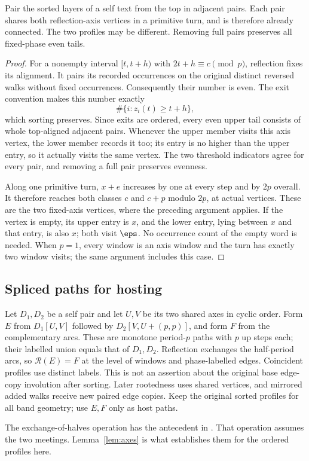 \begin{lemma}\label{lem:axes}
Pair the sorted layers of a self text from the top in adjacent pairs.
Each pair shares both reflection-axis vertices in a primitive turn,
and is therefore already connected. The two profiles may be different.
Removing full pairs preserves all fixed-phase even tails.
\end{lemma}
\begin{proof}
For a nonempty interval $[t,t+h)$ with $2t+h\equiv c\pmod p$,
reflection fixes its alignment. It pairs its recorded occurrences on
the original distinct reversed walks without fixed occurrences.
Consequently their number is even. The exit convention makes this
number exactly
\begin{equation}\label{eq:even-tail}
\#\{i:z_i(t)\ge t+h\},
\end{equation}
which sorting preserves. Since exits are ordered, every even upper
tail consists of whole top-aligned adjacent pairs. Whenever the upper
member visits this axis vertex, the lower member records it too; its
entry is no higher than the upper entry, so it actually visits the same
vertex. The two threshold indicators agree for every pair, and removing
a full pair preserves evenness.

Along one primitive turn, $x+e$ increases by one at every step and by
$2p$ overall. It therefore reaches both classes $c$ and $c+p$ modulo
$2p$, at actual vertices. These are the two fixed-axis vertices, where
the preceding argument applies. If the vertex is empty, its upper
entry is $x$, and the lower entry, lying between $x$ and that entry,
is also $x$; both visit $\eps$. No occurrence count of the empty word
is needed. When $p=1$, every window is an axis window and the turn has
exactly two window visits; the same argument includes this case.
\end{proof}

\subsection{Spliced paths for hosting}\label{sec:splice}
Let $D_1,D_2$ be a self pair and let $U,V$ be its two shared axes in
cyclic order. Form $E$ from $D_1[U,V]$ followed by
$D_2[V,U+(p,p)]$, and form $F$ from the complementary arcs.
These are monotone period-$p$ paths with $p$ up steps each; their
labelled union equals that of $D_1,D_2$. Reflection exchanges the
half-period arcs, so $\mathcal R(E)=F$ at the level of windows and
phase-labelled edges. Coincident profiles use distinct labels.
This is not an assertion about the original base edge-copy involution
after sorting. Later rootedness uses shared vertices, and mirrored
added walks receive new paired edge copies. Keep the original sorted
profiles for all band geometry; use $E,F$ only as host paths.

The exchange-of-halves operation has the antecedent in
\cite[Section 5]{gk}. That operation assumes the two meetings.
Lemma~\ref{lem:axes} is what establishes them for the ordered profiles here.
